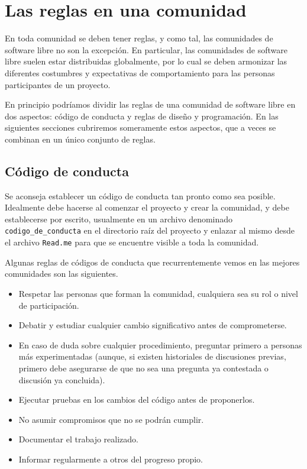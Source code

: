 \chapter{Las reglas en una comunidad}

En toda comunidad se deben tener reglas, y como tal, las comunidades de software libre no son la excepción. En particular, las comunidades de software libre suelen estar distribuidas globalmente, por lo cual se deben armonizar las diferentes costumbres y expectativas de comportamiento para las personas participantes de un proyecto.

En principio podríamos dividir las reglas de una comunidad de software libre en dos aspectos: código de conducta y reglas de diseño y programación. En las siguientes secciones cubriremos someramente estos aspectos, que a veces se combinan en un único conjunto de reglas.

\section{Código de conducta}

Se aconseja establecer un código de conducta tan pronto como sea posible. Idealmente debe hacerse al comenzar el proyecto y crear la comunidad, y debe establecerse por escrito, usualmente en un archivo denominado \texttt{codigo\_de\_conducta} en el directorio raíz del proyecto y enlazar al mismo desde el archivo \texttt{Read.me} para que se encuentre visible a toda la comunidad.

Algunas reglas de códigos de conducta que recurrentemente vemos en las mejores comunidades son las siguientes.

\begin{itemize}
\item Respetar las personas que forman la comunidad, cualquiera sea su rol o nivel de participación.
\item Debatir y estudiar cualquier cambio significativo antes de comprometerse.
\item En caso de duda sobre cualquier procedimiento, preguntar primero a personas más experimentadas (aunque, si existen historiales de discusiones previas, primero debe asegurarse de que no sea una pregunta ya contestada o discusión ya concluida).
\item Ejecutar pruebas en los cambios del código antes de proponerlos.
\item No asumir compromisos que no se podrán cumplir.
\item Documentar el trabajo realizado.
\item Informar regularmente a otros del progreso propio.
\end{itemize}


